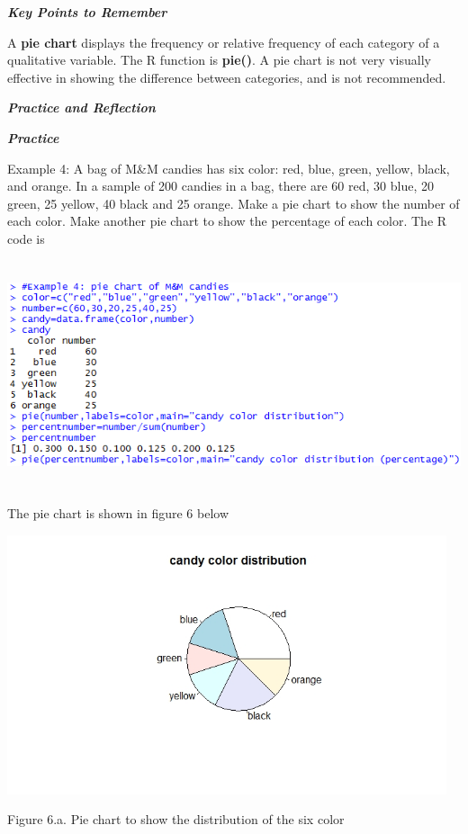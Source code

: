\emph{\textbf{Key Points to Remember}}

A \textbf{pie chart} displays the frequency or relative frequency of
each category of a qualitative variable. The R function is
\textbf{pie()}. A pie chart is not very visually effective in showing
the difference between categories, and is not recommended.

\emph{\textbf{Practice and Reflection}}

\emph{\textbf{Practice}}

Example 4: A bag of M\&M candies has six color: red, blue, green,
yellow, black, and orange. In a sample of 200 candies in a bag, there
are 60 red, 30 blue, 20 green, 25 yellow, 40 black and 25 orange. Make a
pie chart to show the number of each color. Make another pie chart to
show the percentage of each color. The R code is

\includegraphics[width=6.5in,height=2.63542in]{media/image8.png}

The pie chart is shown in figure 6 below

\includegraphics[width=5.08604in,height=3in]{media/image9.jpeg}

Figure 6.a. Pie chart to show the distribution of the six color

